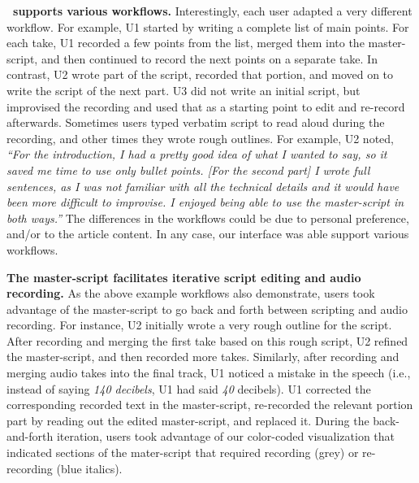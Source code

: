 \textbf{\systemname\ supports various workflows.} Interestingly, each user adapted a very different workflow. For example, U1 started by writing a complete list of main points. For each take, U1 recorded a few points from the list, merged them into the master-script, and then continued to record the next points on a separate take. In contrast, U2 wrote part of the script, recorded that portion, and moved on to write the script of the next part. U3 did not write an initial script, but improvised the recording and used that as a starting point to edit and re-record afterwards. Sometimes users typed verbatim script to read aloud during the recording, and other times they wrote rough outlines. For example, U2 noted,  \textit{``For
the introduction, I had a pretty good idea of what I wanted to
say, so it saved me time to use only bullet points. [For the
second part] I wrote full sentences, as I was not familiar with
all the technical details and it would have been more difficult
to improvise. I enjoyed being able to use the master-script in
both ways.''} The differences in the workflows could be due to personal preference, and/or  to the article content. In any case, our interface was able support various workflows. 

\textbf{The master-script facilitates iterative script editing and audio recording.} As the above example workflows also demonstrate, users took advantage of the master-script to go back and forth between scripting and audio recording. For instance, U2 initially wrote a very rough outline for the script.
After recording and merging the first take based on this rough script, U2 refined the master-script, and then recorded more takes. Similarly, after recording and merging audio takes into the final track, U1 noticed a mistake in the speech
(i.e., instead of saying \textit{140 decibels}, U1 had said \textit{40}
decibels). U1 corrected the corresponding recorded text in the
master-script, re-recorded
the relevant portion part by reading out the edited master-script, and replaced it.
During the back-and-forth iteration, users took advantage of our color-coded visualization that indicated sections of the mater-script that required recording  (grey) or re-recording (blue italics). 


